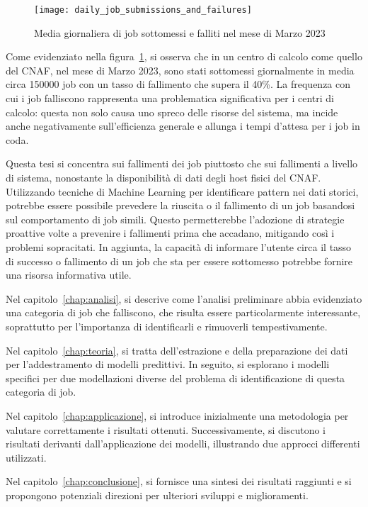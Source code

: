 \begin{figure}[!ht]
    \begin{center}
        \texttt{[image: daily\_job\_submissions\_and\_failures]}
    \end{center}
    \caption{Media giornaliera di job sottomessi e falliti nel mese di Marzo
    2023}\label{fig:daily_job_submissions_and_failures}
\end{figure}

Come evidenziato nella figura~\ref{fig:daily_job_submissions_and_failures}, si
osserva che in un centro di calcolo come quello del CNAF, nel mese di Marzo
2023, sono stati sottomessi giornalmente in media circa 150000 job con un
tasso di fallimento che supera il 40\%. 
La frequenza con cui i job falliscono rappresenta una problematica
significativa per i centri di calcolo: questa non solo causa uno spreco delle
risorse del sistema, ma incide anche negativamente sull'efficienza generale e
allunga i tempi d'attesa per i job in coda.

Questa tesi si concentra sui fallimenti dei job piuttosto che sui fallimenti a
livello di sistema, nonostante la disponibilità di dati degli host fisici del
CNAF. Utilizzando tecniche di Machine Learning per identificare pattern nei
dati storici, potrebbe essere possibile prevedere la riuscita o il fallimento
di un job basandosi sul comportamento di job simili. Questo permetterebbe
l'adozione di strategie proattive volte a prevenire i fallimenti prima che
accadano, mitigando così i problemi sopracitati. In aggiunta, la capacità di
informare l'utente circa il tasso di successo o fallimento di un job che sta
per essere sottomesso potrebbe fornire una risorsa informativa utile.

\mbox{}

Nel capitolo~\ref{chap:analisi}, si descrive come l'analisi preliminare abbia
evidenziato una categoria di job che falliscono, che risulta essere
particolarmente interessante, soprattutto per l'importanza di identificarli e
rimuoverli tempestivamente.

\mbox{}

Nel capitolo~\ref{chap:teoria}, si tratta dell'estrazione e della preparazione
dei dati per l'addestramento di modelli predittivi. In seguito, si esplorano i
modelli specifici per due modellazioni diverse del problema di identificazione
di questa categoria di job.

\mbox{}

Nel capitolo~\ref{chap:applicazione}, si introduce inizialmente una
metodologia per valutare correttamente i risultati ottenuti. Successivamente,
si discutono i risultati derivanti dall'applicazione dei modelli, illustrando
due approcci differenti utilizzati.

\mbox{}

Nel capitolo~\ref{chap:conclusione}, si fornisce una sintesi dei risultati
raggiunti e si propongono potenziali direzioni per ulteriori sviluppi e
miglioramenti. 
